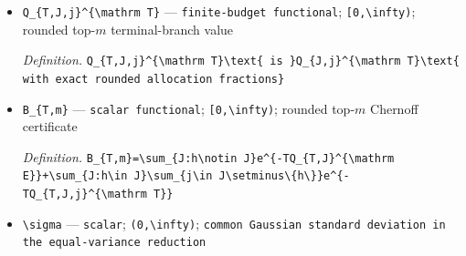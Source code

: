 \documentclass{article}
\begin{document}
\begin{itemize}
  \par\smallskip\noindent\emph{Definition.} \texttt{Q\_\allowbreak{}\{T,\allowbreak{}J\}\allowbreak{}\textasciicircum{}\{\textbackslash{}\allowbreak{}mathrm E\}\allowbreak{}\textbackslash{}\allowbreak{}text\{ is \}\allowbreak{}Q\_\allowbreak{}J\textasciicircum{}\{\textbackslash{}\allowbreak{}mathrm E\}\allowbreak{}\textbackslash{}\allowbreak{}text\{ with exact rounded allocation fractions\}\allowbreak{}}
  \item \texttt{Q\_\allowbreak{}\{T,\allowbreak{}J,\allowbreak{}j\}\allowbreak{}\textasciicircum{}\{\textbackslash{}\allowbreak{}mathrm T\}\allowbreak{}} --- \texttt{finite-\allowbreak{}budget functional}; \texttt{[0,\allowbreak{}\textbackslash{}\allowbreak{}infty)}; rounded top-\(m\) terminal-branch value
  \par\smallskip\noindent\emph{Definition.} \texttt{Q\_\allowbreak{}\{T,\allowbreak{}J,\allowbreak{}j\}\allowbreak{}\textasciicircum{}\{\textbackslash{}\allowbreak{}mathrm T\}\allowbreak{}\textbackslash{}\allowbreak{}text\{ is \}\allowbreak{}Q\_\allowbreak{}\{J,\allowbreak{}j\}\allowbreak{}\textasciicircum{}\{\textbackslash{}\allowbreak{}mathrm T\}\allowbreak{}\textbackslash{}\allowbreak{}text\{ with exact rounded allocation fractions\}\allowbreak{}}
  \item \texttt{B\_\allowbreak{}\{T,\allowbreak{}m\}\allowbreak{}} --- \texttt{scalar functional}; \texttt{[0,\allowbreak{}\textbackslash{}\allowbreak{}infty)}; rounded top-\(m\) Chernoff certificate
  \par\smallskip\noindent\emph{Definition.} \texttt{B\_\allowbreak{}\{T,\allowbreak{}m\}\allowbreak{}=\allowbreak{}\textbackslash{}\allowbreak{}sum\_\allowbreak{}\{J:\allowbreak{}h\textbackslash{}\allowbreak{}notin J\}\allowbreak{}e\textasciicircum{}\{-\allowbreak{}TQ\_\allowbreak{}\{T,\allowbreak{}J\}\allowbreak{}\textasciicircum{}\{\textbackslash{}\allowbreak{}mathrm E\}\allowbreak{}\}\allowbreak{}+\allowbreak{}\textbackslash{}\allowbreak{}sum\_\allowbreak{}\{J:\allowbreak{}h\textbackslash{}\allowbreak{}in J\}\allowbreak{}\textbackslash{}\allowbreak{}sum\_\allowbreak{}\{j\textbackslash{}\allowbreak{}in J\textbackslash{}\allowbreak{}setminus\textbackslash{}\allowbreak{}\{h\textbackslash{}\allowbreak{}\}\allowbreak{}\}\allowbreak{}e\textasciicircum{}\{-\allowbreak{}TQ\_\allowbreak{}\{T,\allowbreak{}J,\allowbreak{}j\}\allowbreak{}\textasciicircum{}\{\textbackslash{}\allowbreak{}mathrm T\}\allowbreak{}\}\allowbreak{}}
  \item \texttt{\textbackslash{}\allowbreak{}sigma} --- \texttt{scalar}; \texttt{(0,\allowbreak{}\textbackslash{}\allowbreak{}infty)}; \texttt{common Gaussian standard deviation in the equal-\allowbreak{}variance reduction}

\end{itemize}
\end{document}
